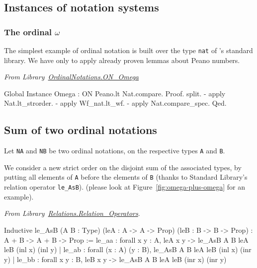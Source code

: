 \subsection{Instances of notation systems}


\subsubsection{The ordinal \texorpdfstring{$\omega$}{omega}}

The simplest example of ordinal notation is built over the type \texttt{nat} of \coq's standard library. We have only to apply already proven lemmas about Peano numbers.

\vspace{4pt}
\noindent\emph{From Library~\href{../src/html/hydras.OrdinalNotations/ON_Omega.html}{OrdinalNotations.ON\_Omega}}


\begin{Coqsrc}
Global Instance Omega : ON  Peano.lt Nat.compare.
Proof.
 split.
 - apply Nat.lt_strorder.
 - apply Wf_nat.lt_wf.
 - apply Nat.compare_spec.
Qed.
\end{Coqsrc}


\subsection{Sum of two ordinal notations}

Let \texttt{NA} and \texttt{NB} be two ordinal notations, on the respective types \texttt{A} and \texttt{B}.

 We consider a new strict order
on the disjoint sum of the associated types, by putting all elements of \texttt{A} before the elements of \texttt{B} (thanks to Standard Library's relation operator \texttt{le\_AsB}).
(please look at Figure~\ref{fig:omega-plus-omega} for an example).


\emph{From Library~\href{https://coq.inria.fr/distrib/current/stdlib/Coq.Relations.Relation_Operators.html}{Relations.Relation\_Operators}}.

\begin{Coqanswer}
Inductive
le_AsB (A B : Type) (leA : A -> A -> Prop) (leB : B -> B -> Prop)
  : A + B -> A + B -> Prop :=
    le_aa : forall x y : A, leA x y -> le_AsB A B leA leB (inl x) (inl y)
  | le_ab : forall (x : A) (y : B), le_AsB A B leA leB (inl x) (inr y)
  | le_bb : forall x y : B, leB x y -> le_AsB A B leA leB (inr x) (inr y)
\end{Coqanswer}


